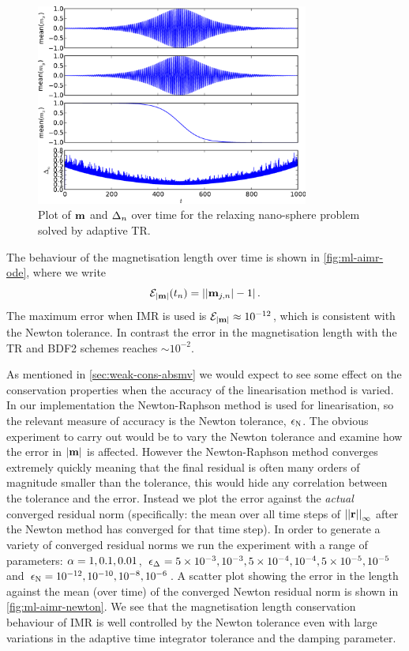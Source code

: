 \begin{figure}
  \centering
  \includegraphics[width=0.8\textwidth]{plots/aimr-sphere-relax/tr1-meanmxsvs-meanmysvs-meanmzsvs-dtsvstimes.pdf}
  \caption{Plot of $\boldsymbol{\mathrm{m}}$ and $\Delta_{n}$ over time for the relaxing nano-sphere problem solved by adaptive TR.}
  \label{fig:tr-llg-ode}
\end{figure}

The behaviour of the magnetisation length over time is shown in \cref{fig:ml-aimr-ode}, where we write
\begin{equation}
  \mathcal{E}_{\left|{\boldsymbol{\mathrm{m}}} \right|}(t_n) =  \left|{\left|{\boldsymbol{\mathrm{m}}_{j,n}} \right| - 1} \right|.
\end{equation}
The maximum error when IMR is used is $\mathcal{E}_{\left|{\boldsymbol{\mathrm{m}}} \right|} \approx 10^{-12}$, which is consistent with the Newton tolerance.
In contrast the error in the magnetisation length with the TR and BDF2 schemes reaches $\sim 10^{-2}$.

As mentioned in \cref{sec:weak-cons-absmv} we would expect to see some effect on the conservation properties when the accuracy of the linearisation method is varied.
In our implementation the Newton-Raphson method is used for linearisation, so the relevant measure of accuracy is the Newton tolerance, $\epsilon_{\mathrm{N}}$.
The obvious experiment to carry out would be to vary the Newton tolerance and examine how the error in $\left|{\boldsymbol{\mathrm{m}}} \right|$ is affected.
However the Newton-Raphson method converges extremely quickly meaning that the final residual is often many orders of magnitude smaller than the tolerance, this would hide any correlation between the tolerance and the error.
Instead we plot the error against the \emph{actual} converged residual norm (specifically: the mean over all time steps of $\left| \left| \boldsymbol{\mathrm{r}} \right| \right|_\infty$ after the Newton method has converged for that time step).
In order to generate a variety of converged residual norms we run the experiment with a range of parameters:  $\alpha=1, 0.1, 0.01$, $\epsilon_{\Delta_{}} = 5\times 10^{-3}, 10^{-3}, 5\times10^{-4}, 10^{-4}, 5\times10^{-5}, 10^{-5}$ and $\epsilon_{\mathrm{N}}=10^{-12}, 10^{-10}, 10^{-8}, 10^{-6}$.
A scatter plot showing the error in the length against the mean (over time) of the converged Newton residual norm is shown in \cref{fig:ml-aimr-newton}.
We see that the magnetisation length conservation behaviour of IMR is well controlled by the Newton tolerance even with large variations in the adaptive time integrator tolerance and the damping parameter.


